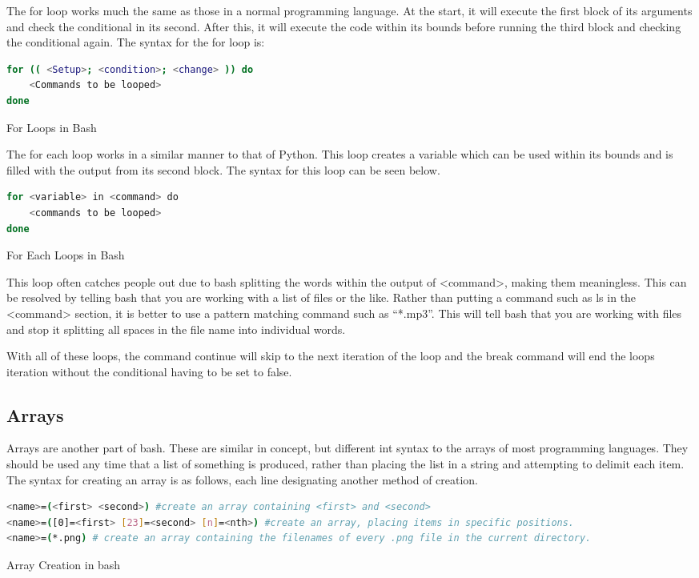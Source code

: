 			The for loop works much the same as those in a normal programming language.
			At the start, it will execute the first block of its arguments and check the conditional in its second.
			After this, it will execute the code within its bounds before running the third block and checking the conditional again.
			The syntax for the for loop is:
			\begin{code}
			\begin{lstlisting}[language=bash]
for (( <Setup>; <condition>; <change> )) do
	<Commands to be looped>
done
			\end{lstlisting}
			\label{code:ForLoopBash}
			\caption{For Loops in Bash}
			\end{code}
			The for each loop works in a similar manner to that of Python.
			This loop creates a variable which can be used within its bounds and is filled with the output from its second block.
			The syntax for this loop can be seen below.
			\begin{code}
			\begin{lstlisting}[language=bash]
for <variable> in <command> do
	<commands to be looped>
done
			\end{lstlisting}
			\label{code:ForEachBash}
			\caption{For Each Loops in Bash}
			\end{code}
			This loop often catches people out due to bash splitting the words within the output of <command>, making them meaningless.
			This can be resolved by telling bash that you are working with a list of files or the like.
			Rather than putting a command such as ls in the <command> section, it is better to use a pattern matching command such as ``*.mp3''.
			This will tell bash that you are working with files and stop it splitting all spaces in the file name into individual words.

			With all of these loops, the command continue will skip to the next iteration of the loop and the break command will end the loops iteration without the conditional having to be set to false.

		\subsection{Arrays}
			Arrays are another part of bash.
			These are similar in concept, but different int syntax to the arrays of most programming languages.
			They should be used any time that a list of something is produced, rather than placing the list in a string and attempting to delimit each item.
			The syntax for creating an array is as follows, each line designating another method of creation.
			\begin{code}
			\begin{lstlisting}[language=bash]
<name>=(<first> <second>) #create an array containing <first> and <second>
<name>=([0]=<first> [23]=<second> [n]=<nth>) #create an array, placing items in specific positions.
<name>=(*.png) # create an array containing the filenames of every .png file in the current directory.
			\end{lstlisting}
			\label{code:ArrayCreationBash}
			\caption{Array Creation in bash}
			\end{code}


